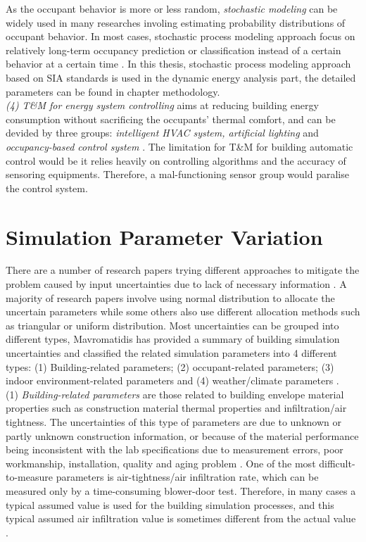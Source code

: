 \documentclass[a4paper, oneside]{discothesis}
\begin{document}
			As the occupant behavior is more or less random, \textit{stochastic modeling} can be widely used in many researches involing estimating probability distributions of occupant behavior. In most cases, stochastic process modeling approach focus on relatively long-term occupancy prediction or classification instead of a certain behavior at a certain time \cite{ZOU2018165}.
			In this thesis, stochastic process modeling approach based on SIA standards is used in the dynamic energy analysis part, the detailed parameters can be found in chapter methodology.\\

			\textit{(4) T\&M for energy system controlling} aims at reducing building energy consumption without sacrificing the occupants' thermal comfort, and can be devided by three groups: \textit{intelligent HVAC system, artificial lighting} and \textit{occupancy-based control system} \cite{ZOU2018165,hong2015review}. The limitation for T\&M for building automatic control would be it relies heavily on controlling algorithms and the accuracy of sensoring equipments. Therefore, a mal-functioning sensor group would paralise the control system.

	\section{Simulation Parameter Variation}
		There are a number of research papers trying different approaches to mitigate the problem caused by input uncertainties due to lack of necessary information \cite{GeorgeThesis}. A majority of research papers involve using normal distribution to allocate the uncertain parameters while some others also use different allocation methods such as triangular or uniform distribution. Most uncertainties can be grouped into different types, Mavromatidis \cite{GeorgeThesis} has provided a summary of building simulation uncertainties and classified the related simulation parameters into 4 different types: (1) Building-related parameters; (2) occupant-related parameters; (3) indoor environment-related parameters and (4) weather/climate parameters \cite{GeorgeThesis}.\\

		(1) \textit{Building-related parameters} are those related to building envelope material properties such as construction material thermal properties and infiltration/air tightness. The uncertainties of this type of parameters are due to unknown or partly unknown construction information, or because of the material performance being inconsistent with the lab specifications due to measurement errors, poor workmanship, installation, quality and aging problem \cite{GeorgeThesis}. One of the most difficult-to-measure parameters is air-tightness/air infiltration rate, which can be measured only by a time-consuming blower-door test. Therefore, in many cases a typical assumed value is used for the building simulation processes, and this typical assumed air infiltration value is sometimes different from the actual value \cite{GeorgeThesis,burhenne2013uncertainty}.\\
\end{document}
